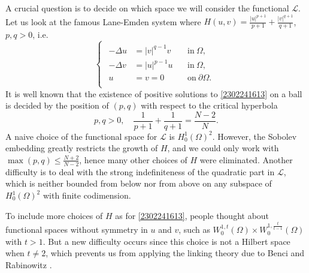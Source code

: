 \documentclass[10pt]{article}
\numberwithin{equation}{section}
\numberwithin{equation}{section}
\begin{document}
A crucial question is to decide on which space we will consider the functional $\mathcal{L}$. Let us look at the famous Lane-Emden system where $H(u,v) = \frac{|u|^{p+1}}{p+1} + \frac{|v|^{q+1}}{q+1}$, $p, q > 0$, i.e.
\begin{equation}\label{2302241613}
\begin{cases}
\begin{aligned}
-\Delta u& =|v|^{q-1}v \,&&\text{in}~\Omega,\\
-\Delta v& =|u|^{p-1}u \,&&\text{in}~\Omega,\\
u &= v = 0~~&&\text{on} ~\partial\Omega.\\
\end{aligned}
\end{cases}
\end{equation}
It is well known that the existence of positive solutions to \eqref{2302241613} on a ball is decided by the position of $(p, q)$ with respect to the critical hyperbola
\begin{equation}\label{2212031636}
p, q > 0, \quad \frac{1}{p+1}+\frac{1}{q+1}=\frac{N-2}{N}.
\end{equation}
A naive choice of the functional space for $\mathcal{L}$ is $H_0^1(\Omega)^2$. However, the Sobolev embedding greatly restricts the growth of $H$, and we could only work with $\max(p, q) \leq \frac{N+2}{N-2}$, hence many other choices of $H$ were eliminated. Another difficulty is to deal with the strong indefiniteness of the quadratic part in $\mathcal{L}$, which is neither bounded from below nor from above on any subspace of $H_0^1(\Omega)^2$ with finite codimension.

To include more choices of $H$ as for \eqref{2302241613}, people thought about functional spaces without symmetry in $u$ and $v$, such as $W_0^{1,t}(\Omega)\times W_0^{1,\frac{t}{t-1}}(\Omega)$ with $t>1$. But a new difficulty occurs since this choice is not a Hilbert space when $t\neq 2$, which prevents us from applying the linking theory due to Benci and Rabinowitz \cite{BR1979}.
\end{document}
